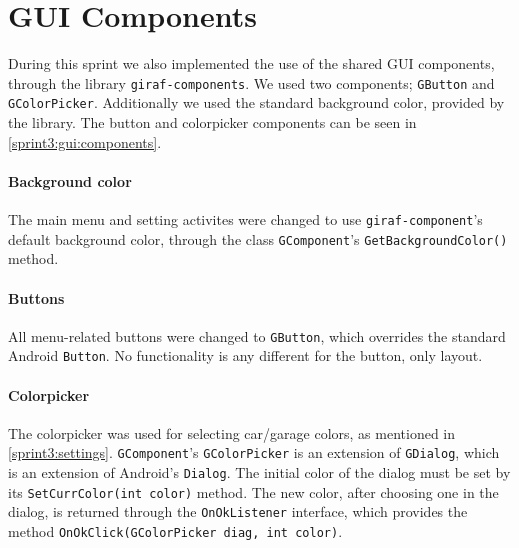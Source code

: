 \section{GUI Components}
During this sprint we also implemented the use of the shared GUI components, through the library \lstinline|giraf-components|.
We used two components; \lstinline|GButton| and \lstinline|GColorPicker|.
Additionally we used the standard background color, provided by the library.
The button and colorpicker components can be seen in \cref{sprint3:gui:components}.

\paragraph{Background color}
The main menu and setting activites were changed to use \lstinline|giraf-component|'s default background color, through the class \lstinline|GComponent|'s \lstinline|GetBackgroundColor()| method.

\paragraph{Buttons}
All menu-related buttons were changed to \lstinline|GButton|, which overrides the standard Android \lstinline|Button|.
No functionality is any different for the button, only layout.

\paragraph{Colorpicker}
The colorpicker was used for selecting car/garage colors, as mentioned in \cref{sprint3:settings}.
\lstinline|GComponent|'s \lstinline|GColorPicker| is an extension of \lstinline|GDialog|, which is an extension of Android's \lstinline|Dialog|.
The initial color of the dialog must be set by its \lstinline|SetCurrColor(int color)| method.
The new color, after choosing one in the dialog, is returned through the \lstinline|OnOkListener| interface, which provides the method \lstinline|OnOkClick(GColorPicker diag, int color)|.